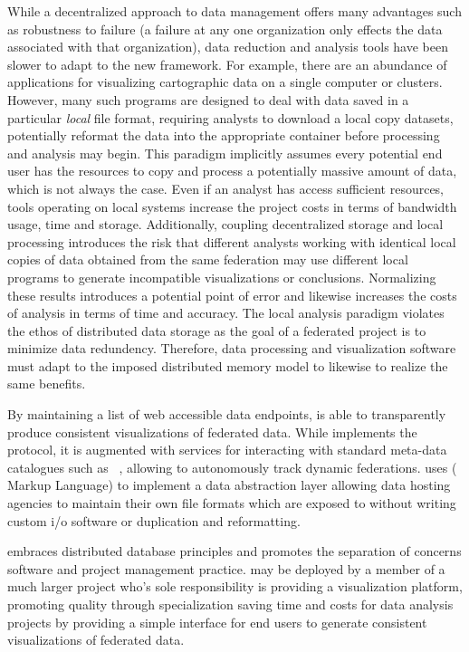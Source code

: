 While a decentralized approach to data management offers many
advantages such as robustness to failure (a failure at any one
organization only effects the data associated with that organization),
data reduction and analysis tools have been slower to adapt to the new
framework. For example, there are an abundance of applications for
visualizing cartographic data on a single computer or
clusters. However, many such programs are designed to deal with data
saved in a particular \textit{local} file format, requiring analysts
to download a local copy datasets, potentially reformat the data into
the appropriate container before processing and analysis may
begin. This paradigm implicitly assumes every potential end user has
the resources to copy and process a potentially massive amount of
data, which is not always the case. Even if an analyst has access
sufficient resources, tools operating on local systems increase the
project costs in terms of bandwidth usage, time and
storage. Additionally, coupling decentralized storage and local
processing introduces the risk that different analysts working with
identical local copies of data obtained from the same federation may
use different local programs to generate incompatible visualizations
or conclusions. Normalizing these results introduces a potential point
of error and likewise increases the costs of analysis in terms of time
and accuracy. The local analysis paradigm violates the ethos of
distributed data storage as the goal of a federated project is to
minimize data redundency. Therefore, data processing and visualization
software must adapt to the imposed distributed memory model to
likewise to realize the same benefits.

By maintaining a list of web accessible data endpoints, \sciwms{} is
able to transparently produce consistent visualizations of federated
data. While \sciwms{} implements the \ogc{} \wms{} protocol, it is
augmented with services for interacting with standard meta-data
catalogues such as \csw{}~\cite{csw14}, allowing \sciwms{} to
autonomously track dynamic federations. \sciwms{} uses \ncml{}
(\netcdf{} Markup Language) to implement a data abstraction layer
allowing data hosting agencies to maintain their own file formats
which are exposed to \sciwms{} without writing custom i/o software or
duplication and reformatting.

\sciwms{} embraces distributed database principles and promotes the
separation of concerns software and project management
practice. \sciwms{} may be deployed by a member of a much larger
project who's sole responsibility is providing a visualization
platform, promoting quality through specialization saving time and
costs for data analysis projects by providing a simple interface for
end users to generate consistent visualizations of federated
data. 
